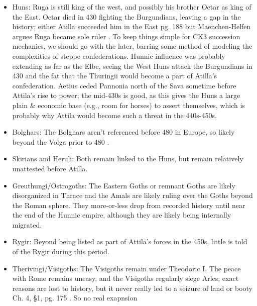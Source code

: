 \documentclass{article}
\newcommand{\specificCite}[1]{\tiny #1 \normalsize}
\begin{document}
	\begin{itemize}
		\item Huns:\newline
		Ruga is still king of the west, and possibly his brother Octar as king of the East.
		Octar died in 430 fighting the Burgundians, leaving a gap in the history; either Atilla succeeded him in the East \cite{CambridgeHistoryEarlyInnerAsia} \specificCite{pg. 188} but Maenchen-Helfen argues Ruga became sole ruler \cite{OttoHuns}.
		To keep things simple for CK3 succession mechanics, we should go with the later, barring some method of modeling the complexities of steppe confederations.
		Hunnic influence was probably extending as far as the Elbe, seeing the West Huns attack the Burgundians in 430 and the fat that the Thuringii would become a part of Atilla's confederation.
		Aetius ceded Pannonia north of the Sava sometime before Attila's rise to power; the mid-430s is good, as this gives the Huns a large plain \& economic base (e.g., room for horses) to assert themselves, which is probably why Attila would become such a threat in the 440s-450s.
		
		\item Bolghars:\newline
		The Bolghars aren't referenced before 480 in Europe, so likely beyond the Volga prior to 480 \cite{KimHuns}.
		
		\item Skirians and Heruli:\newline
		Both remain linked to the Huns, but remain relatively unattested before Atilla.
		
		\item Greuthungi/Ostrogoths:\newline
		The Eastern Goths or remnant Goths are likely disorganized in Thrace and the Amals are likely ruling over the Goths beyond the Roman sphere.
		They more-or-less drop from recorded history until near the end of the Hunnic empire, although they are likely being internally migrated.
		
		\item Rygir:\newline
		Beyond being listed as part of Attila's forces in the 450s, little is told of the Rygir during this period.
		
		\item Therivingi/Visigoths:\newline
		The Visigoths remain under Theodoric I.
		The peace with Rome remains uneasy, and the Visigoths regularly siege Arles; exact reasons are lost to history, but it never really led to a seizure of land or booty \cite{WolframHistoryOfTheGoths}\specificCite{Ch. 4, §1, pg. 175}.
		So no real exapnsion
		

\end{itemize}
\end{document}
